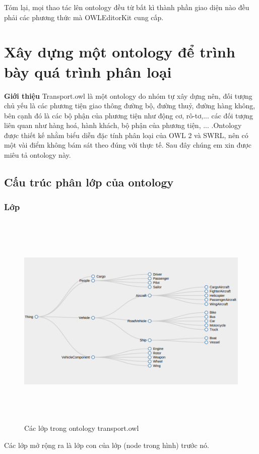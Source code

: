 {Tóm lại, mọi thao tác lên ontology đều từ bất kì thành phần giao diện nào đều phải các phương thức mà OWLEditorKit cung cấp.
\section{Xây dựng một ontology để trình bày quá trình phân loại}
\textbf{Giới thiệu} Transport.owl \cite{owleditorSrc} là một ontology do nhóm tự xây dựng nên, đối tượng chủ yếu là các phương tiện giao thông đường bộ, đường thuỷ, đường hàng không, bên cạnh đó là các bộ phận của phương tiện như động cơ, rô-tơ,... các đối tượng liên quan như hàng hoá, hành khách, bộ phận của phương tiện, ... .Ontology được thiết kế nhằm biểu diễn đặc tính phân loại của OWL 2 và SWRL, nên có một vài điểm không bám sát theo đúng với thực tế. Sau đây chúng em xin được miêu tả ontology này.
\subsection{Cấu trúc phân lớp của ontology}
\subsubsection{Lớp}
\begin{figure}[h!]
	\centering
	\includegraphics[width=155mm,height=105mm]{Figures/transport_cls.png}
	\caption{Các lớp trong ontology transport.owl\label{overflow}}
\end{figure}
Các lớp mở rộng ra là lớp con của lớp (node trong hình) trước nó.
}
